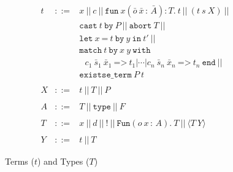 \documentclass[9pt,natbib]{sigplanconf}
\newcommand{\Eq}[0]{\texttt{=}}
\newcommand{\bang}[0]{\texttt{!}}
\begin{document}
\begin{figure}
\begin{eqnarray*}
t & ::= & x\ ||\ c\ ||\ 
       \texttt{fun}\ x(\bar{o}\ \bar{x}\,:\,\bar{A}) : T .\ t\ ||\ (t\ s\ X)\ ||
\\ 
\ &\ &        \texttt{cast}\ t\ \texttt{by}\ P  \ ||\ \texttt{abort}\ T\ ||\\ 
\ & \ & \texttt{let}\ x\ \Eq\ t\ \texttt{by}\ y\ \texttt{in}\ t' \ ||\ 
\\ 
\ & \ & \texttt{match}\ t\ \texttt{by}\ x\ y \ \texttt{with}\\
\ & \ & \ \ \ c_1\ \bar{s}_1\ \bar{x}_1\ \texttt{=>}\ t_1 |
 \cdots | c_n\ \bar{s}_n\ \bar{x}_n\ \texttt{=>}\ t_n\ \texttt{end}\ ||\\
\ & \ & \texttt{existse\_term}\ P\ t
\\
\\
X & ::= & t\ ||\ T\ ||\ P
\\
\\
A & ::= & T\ ||\ \texttt{type}\ ||\ F 
\\
\\
T & ::= & x\ ||\ d\ ||\ \bang\ ||\ 
     \texttt{Fun}(o\ x\,:\,A) . \ T\ ||\ \langle T\ Y\rangle 
\\
\\
Y & ::= & t\ ||\ T
\end{eqnarray*}
\caption{\label{fig:terms} Terms ($t$) and Types ($T$)}
\end{figure}
\end{document}
